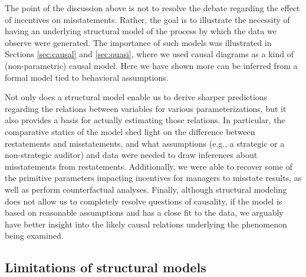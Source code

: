 The point of the discussion above is not to resolve the debate regarding the effect of incentives on misstatements. 
Rather, the goal is to illustrate the necessity of having an underlying structural model of the process by which the data we observe were generated.
The importance of such models was illustrated in Sections \ref{sec:causal} and \ref{sec:quasi}, where we used causal diagrams as a kind of (non-parametric) causal model.
Here we have shown more can be inferred from a formal model tied to behavioral assumptions.

Not only does a structural model enable us to derive sharper predictions regarding the relations between variables for various parameterizations, but it also provides a basis for actually estimating those relations. 
In particular, the comparative statics of the model shed light on the difference between restatements and misstatements, and what assumptions (e.g., a strategic or a non-strategic auditor) and data were needed to draw inferences about misstatements from restatements. 
Additionally, we were able to recover some of the primitive parameters impacting incentives for managers to misstate results, as well as perform counterfactual analyses. Finally, although structural modeling does not allow us to completely resolve questions of causality, if the model is based on reasonable assumptions and has a close fit to the data, we arguably have better insight into the likely causal relations underlying the phenomenon being examined. 

\subsection{Limitations of structural models}

